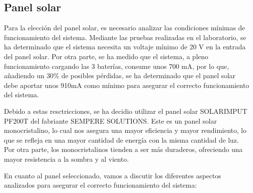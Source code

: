 \subsection{Panel solar}
Para la elección del panel solar, es necesario analizar las condiciones mínimas de funcionamiento del sistema. Mediante las pruebas realizadas en el laboratorio, se ha determinado que el sistema necesita un voltaje mínimo de 20 V en la entrada del panel solar. Por otra parte, se ha medido que el sistema, a pleno funcionamiento cargando las 3 baterías, consume unos 700 mA, por lo que, añadiendo un 30\% de posibles pérdidas, se ha determinado que el panel solar debe aportar unos 910mA como mínimo para asegurar el correcto funcionamiento del sistema.

Debido a estas resctricciones, se ha decidio utilizar el panel solar SOLARIMPUT PF200T del fabriante SEMPERE SOLUTIONS. Este es un panel solar monocristalino, lo cual nos asegura una mayor eficiencia y mayor rendimiento, lo que se refleja en una mayor cantidad de energía con la misma cantidad de luz. Por otra parte, los monocristalinos tienden a ser más duraderos, ofreciendo una mayor resistencia a la sombra y al viento.

En cuanto al panel seleccionado, vamos a discutir los diferentes aspectos analizados para asegurar el correcto funcionamiento del sistema:

